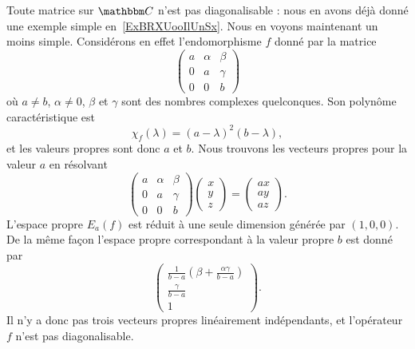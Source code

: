 \begin{remark}  \label{RemBOGooCLMwyb}
    Toute matrice sur \( \eC\) n'est pas diagonalisable : nous en avons déjà donné une exemple simple en~\ref{ExBRXUooIlUnSx}. Nous en voyons maintenant un moins simple. Considérons en effet l'endomorphisme \( f\) donné par la matrice
    \begin{equation}
        \begin{pmatrix}
            a&    \alpha    &   \beta    \\
            0    &   a    &   \gamma    \\
            0    &   0    &   b
        \end{pmatrix}
    \end{equation}
    où \( a\neq b\), \( \alpha\neq 0\), \( \beta\) et \( \gamma\) sont des nombres complexes quelconques.
    Son polynôme caractéristique est
    \begin{equation}
        \chi_f(\lambda)=(a-\lambda)^2(b-\lambda),
    \end{equation}
    et les valeurs propres sont donc \( a\) et \( b\). Nous trouvons les vecteurs propres pour la valeur \( a\) en résolvant
    \begin{equation}
        \begin{pmatrix}
            a    &   \alpha    &   \beta    \\
            0    &   a    &   \gamma    \\
            0    &   0    &   b
        \end{pmatrix}\begin{pmatrix}
            x    \\
            y    \\
            z
        \end{pmatrix}=\begin{pmatrix}
            ax    \\
            ay    \\
            az
        \end{pmatrix}.
    \end{equation}
    L'espace propre \( E_a(f)\) est réduit à une seule dimension générée par \( (1,0,0)\). De la même façon l'espace propre correspondant à la valeur propre \( b\) est donné par
    \begin{equation}
        \begin{pmatrix}
            \frac{1}{ b-a }\left( \beta+\frac{ \alpha\gamma }{ b-a } \right)    \\
            \frac{ \gamma }{ b-a }    \\
            1
        \end{pmatrix}.
    \end{equation}
    Il n'y a donc pas trois vecteurs propres linéairement indépendants, et l'opérateur \( f\) n'est pas diagonalisable.


\end{remark}
